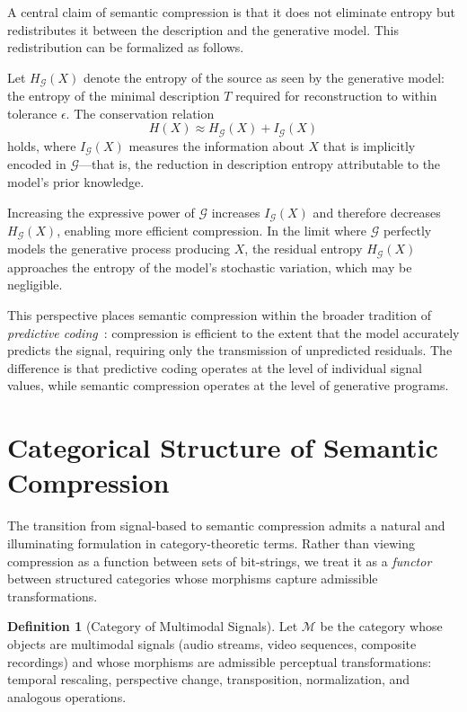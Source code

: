 \documentclass[12pt,a4paper]{article}
\theoremstyle{definition}
\newtheorem{definition}[theorem]{Definition}
\theoremstyle{remark}
\begin{document}
A central claim of semantic compression is that it does not eliminate entropy but redistributes it between the description and the generative model. This redistribution can be formalized as follows.

Let $H_{\mathcal{G}}(X)$ denote the entropy of the source as seen by the generative model: the entropy of the minimal description $T$ required for reconstruction to within tolerance $\epsilon$. The conservation relation
\[
H(X) \approx H_{\mathcal{G}}(X) + I_{\mathcal{G}}(X)
\]
holds, where $I_{\mathcal{G}}(X)$ measures the information about $X$ that is implicitly encoded in $\mathcal{G}$---that is, the reduction in description entropy attributable to the model's prior knowledge.

Increasing the expressive power of $\mathcal{G}$ increases $I_{\mathcal{G}}(X)$ and therefore decreases $H_{\mathcal{G}}(X)$, enabling more efficient compression. In the limit where $\mathcal{G}$ perfectly models the generative process producing $X$, the residual entropy $H_{\mathcal{G}}(X)$ approaches the entropy of the model's stochastic variation, which may be negligible.

This perspective places semantic compression within the broader tradition of \emph{predictive coding}~\cite{friston}: compression is efficient to the extent that the model accurately predicts the signal, requiring only the transmission of unpredicted residuals. The difference is that predictive coding operates at the level of individual signal values, while semantic compression operates at the level of generative programs.

\section{Categorical Structure of Semantic Compression}
\label{sec:categorical}

The transition from signal-based to semantic compression admits a natural and illuminating formulation in category-theoretic terms. Rather than viewing compression as a function between sets of bit-strings, we treat it as a \emph{functor} between structured categories whose morphisms capture admissible transformations.

\begin{definition}[Category of Multimodal Signals]
Let $\mathcal{M}$ be the category whose objects are multimodal signals (audio streams, video sequences, composite recordings) and whose morphisms are admissible perceptual transformations: temporal rescaling, perspective change, transposition, normalization, and analogous operations.
\end{definition}
\end{document}
